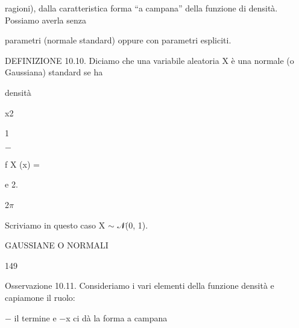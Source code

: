 \documentclass[a4paper,portrait,12pt]{article}
\begin{document}
\begin{flushleft}
ragioni), dalla caratteristica forma {``}a campana'' della funzione di densit\`{a}. Possiamo averla senza
\end{flushleft}


\begin{flushleft}
parametri (normale standard) oppure con parametri espliciti.
\end{flushleft}


\begin{flushleft}
DEFINIZIONE 10.10. Diciamo che una variabile aleatoria X \`{e} una normale (o Gaussiana) standard se ha
\end{flushleft}


\begin{flushleft}
densit\`{a}
\end{flushleft}


\begin{flushleft}
x2
\end{flushleft}


1


$-$


\begin{flushleft}
f X (x) =
\end{flushleft}


\begin{flushleft}
e 2.
\end{flushleft}


\begin{flushleft}
2$\pi$
\end{flushleft}


\begin{flushleft}
Scriviamo in questo caso X $\sim$ 𝒩(0, 1).
\end{flushleft}





\begin{flushleft}
 GAUSSIANE O NORMALI
\end{flushleft}





149





\begin{flushleft}
Osservazione 10.11. Consideriamo i vari elementi della funzione densit\`{a} e capiamone il ruolo:
\end{flushleft}


\begin{flushleft}
$-$ il termine e $-$x ci d\`{a} la forma a campana
\end{flushleft}
\end{document}
